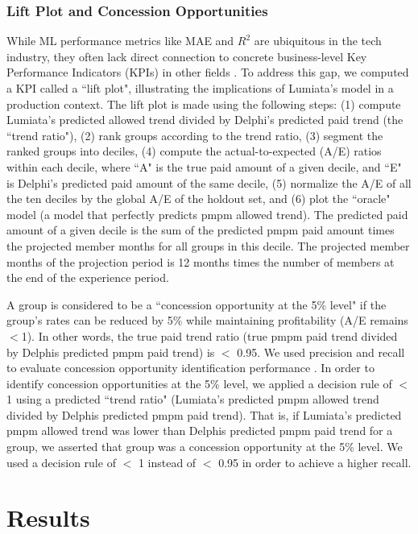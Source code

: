 \documentclass[letterpaper]{article} %
\begin{document}
\subsubsection{Lift Plot and Concession Opportunities}
While ML performance metrics like MAE and $R^{2}$ are ubiquitous in the tech industry, they often lack direct connection to concrete business-level Key Performance Indicators (KPIs) in other fields \cite{AnaTransl}. To address this gap, we computed a KPI called a ``lift plot", illustrating the implications of Lumiata's model in a production context. The lift plot is made using the following steps: (1) compute Lumiata's predicted allowed trend divided by Delphi's predicted paid trend (the ``trend ratio"),
(2) rank groups according to the trend ratio,
(3) segment the ranked groups into deciles,
(4) compute the actual-to-expected (A/E) ratios within each decile, where ``A" is the true paid amount of a given decile, and ``E" is Delphi's predicted paid amount of the same decile,
(5) normalize the A/E of all the ten deciles by the global A/E of the holdout set, and
(6) plot the ``oracle" model (a model that perfectly predicts pmpm allowed trend).
The predicted paid amount of a given decile is the sum of the predicted pmpm paid amount times the projected member months for all groups in this decile.  The projected member months of the projection period is 12 months times the number of members at the end of the experience period.

A group is considered to be a ``concession opportunity at the 5\% level" if the group's rates can be reduced by 5\% while maintaining profitability (A/E remains $<$1). In other words, the true paid trend ratio (true pmpm paid trend divided by Delphis predicted pmpm paid trend) is $<$ 0.95.  We used precision and recall to evaluate concession opportunity identification performance \cite{PrecRecall}. In order to identify concession opportunities at the 5\% level, we applied a decision rule of $<$ 1 using a predicted ``trend ratio" (Lumiata's predicted pmpm allowed trend divided by Delphis predicted pmpm paid trend). That is, if Lumiata's predicted pmpm allowed trend was lower than Delphis predicted pmpm paid trend for a group, we asserted that group was a concession opportunity at the 5\% level. We used a decision rule of $<$ 1 instead of $<$ 0.95 in order to achieve a higher recall.






\section*{Results}
\end{document}
